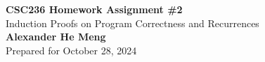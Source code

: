 \begin{titlepage}
    \null %
    \vfill
    \begin{center}
        {\fontsize{40}{48}\selectfont \bfseries CSC236 Homework Assignment \#2}
        \vspace{20pt} \\
        {\LARGE Induction Proofs on Program Correctness and Recurrences} \\
        \vspace{20pt}
        \textbf{Alexander He Meng}
        \vspace{8pt}
        \\ Prepared for October 28, 2024
    \end{center}
    \vfill
\end{titlepage}
